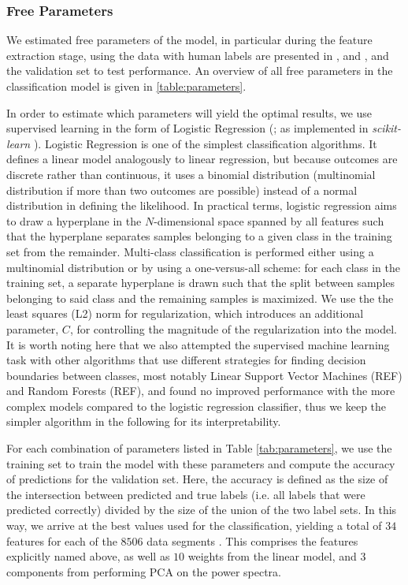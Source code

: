 \documentclass[12pt]{emulateapj}
\begin{document}
\subsubsection{Free Parameters}
\label{sec:freeparams}

We estimated free parameters of the model, in particular during the feature extraction stage, using the data with human labels are presented in \citet{belloni2000}, \citet{kleinwolt2002} and \citet{hannikainen2003}, and the validation set to test performance. An overview of all free parameters in the classification model is given in \ref{table:parameters}.

In order to estimate which parameters will yield the optimal results, we use supervised learning in the form of Logistic Regression (\citealt{cox1958}; as implemented in \textit{scikit-learn} \citealt{scikit-learn}). Logistic Regression is one of the simplest classification algorithms. It defines a linear model analogously to linear regression, but because outcomes are discrete rather than continuous, it uses a binomial distribution (multinomial distribution if more than two outcomes are possible) instead of a normal distribution in defining the likelihood. In practical terms, logistic regression aims to draw a hyperplane in the $N$-dimensional space spanned by all features such that the hyperplane separates samples belonging to a given class in the training set from the remainder. Multi-class classification is performed either using a multinomial distribution or by using a one-versus-all scheme: for each class in the training set, a separate hyperplane is drawn such that the split between samples belonging to said class and the remaining samples is maximized. We use the the least squares (L2) norm for regularization, which introduces an additional parameter, $C$, for controlling the magnitude of the regularization into the  model. It is worth noting here that we also attempted the supervised machine learning task with other algorithms that use different strategies for finding decision boundaries between classes, most notably Linear Support Vector Machines (REF) and Random Forests (REF), and found no improved performance with the more complex models compared to the logistic regression classifier, thus we keep the simpler algorithm in the following for its interpretability.

For each combination of parameters listed in Table \ref{tab:parameters}, we use the training set to train the model with these parameters and compute the accuracy of predictions for the validation set.  Here, the accuracy is defined as the size of the intersection between predicted and true labels (i.e. all labels that were predicted correctly) divided by the size of the union of the two label sets. In this way, we arrive at the best values used for the classification, yielding a total of $34$ features for each of the $8506$ data segments . This comprises the features explicitly named above, as well as $10$ weights from the linear model, and $3$ components from performing PCA on the power spectra.
\end{document}

